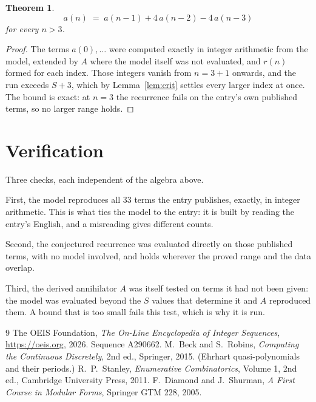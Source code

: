 \documentclass[11pt,a4paper]{article}
\theoremstyle{plain}
\newtheorem{theorem}{Theorem}
\theoremstyle{definition}
\begin{document}
\begin{theorem}
\[
a(n)\;=\;a(n-1) + 4\,a(n-2) - 4\,a(n-3)
\]
for every $n>3$.
\end{theorem}

\begin{proof}
The terms $a(0),\dots$ were computed exactly in integer arithmetic from the model, extended by
$A$ where the model itself was not evaluated, and $r(n)$ formed for each index. Those integers
vanish from $n=3+1$ onwards, and the run exceeds $S+3$, which by
Lemma~\ref{lem:crit} settles every larger index at once. The bound is exact: at $n=3$ the recurrence fails on the entry's own published terms, so no larger range holds.
\end{proof}

\section{Verification}

Three checks, each independent of the algebra above.

First, the model reproduces all $33$ terms the entry publishes, exactly, in integer
arithmetic. This is what ties the model to the entry: it is built by reading the entry's
English, and a misreading gives different counts.

Second, the conjectured recurrence was evaluated directly on those published terms, with no
model involved, and holds wherever the proved range and the data overlap.

Third, the derived annihilator $A$ was itself tested on terms it had not been given: the model
was evaluated beyond the $S$ values that determine it and $A$ reproduced them. A bound that is
too small fails this test, which is why it is run.

\begin{thebibliography}{9}
 The OEIS Foundation, \emph{The On-Line Encyclopedia of Integer
Sequences}, \url{https://oeis.org}, 2026. Sequence A290662.
 M.~Beck and S.~Robins, \emph{Computing the Continuous Discretely},
2nd ed., Springer, 2015. (Ehrhart quasi-polynomials and their periods.)
 R.~P.~Stanley, \emph{Enumerative Combinatorics}, Volume 1, 2nd ed.,
Cambridge University Press, 2011.
 F.~Diamond and J.~Shurman, \emph{A First Course in Modular Forms},
Springer GTM 228, 2005.
\end{thebibliography}
\end{document}
